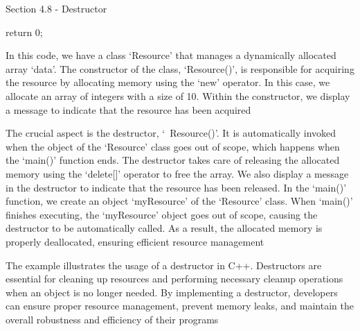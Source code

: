 \begin{notes}{Section 4.8 - Destructor}
\begin{highlight}
\begin{code}[C++]
{        return 0;
    }
    \end{code}
        In this code, we have a class `Resource' that manages a dynamically allocated array `data'. The constructor of the class, `Resource()', is responsible for acquiring the resource by allocating memory using the `new' operator. In this case, we allocate an 
        array of integers with a size of 10. Within the constructor, we display a message to indicate that the resource has been acquired
        
        The crucial aspect is the destructor, `~Resource()'. It is automatically invoked when the object of the `Resource' class goes out of scope, which happens when the `main()' function ends. The destructor takes care of releasing the allocated memory using 
        the `delete[]' operator to free the array. We also display a message in the destructor to indicate that the resource has been released. In the `main()' function, we create an object `myResource' of the `Resource' class. When `main()' finishes executing, 
        the `myResource' object goes out of scope, causing the destructor to be automatically called. As a result, the allocated memory is properly deallocated, ensuring efficient resource management
        
        The example illustrates the usage of a destructor in C++. Destructors are essential for cleaning up resources and performing necessary cleanup operations when an object is no longer needed. By implementing a destructor, developers can ensure proper resource 
        management, prevent memory leaks, and maintain the overall robustness and efficiency of their programs
    \end{highlight}
\end{notes}

